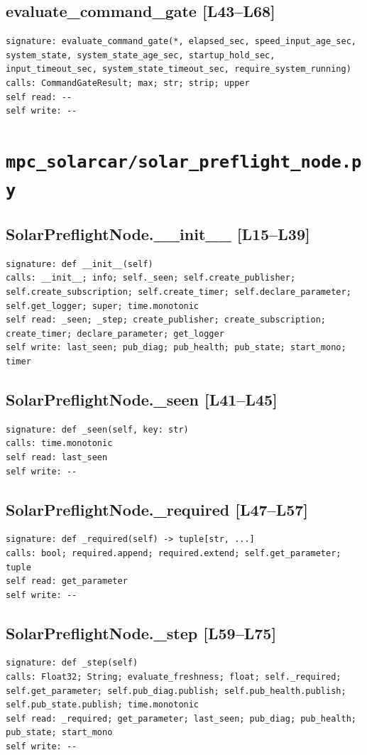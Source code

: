 \documentclass[a4paper,10pt,oneside]{book}
\begin{document}
\subsection*{evaluate\_command\_gate [L43--L68]}
\begin{lstlisting}[numbers=none]
signature: evaluate_command_gate(*, elapsed_sec, speed_input_age_sec, system_state, system_state_age_sec, startup_hold_sec, input_timeout_sec, system_state_timeout_sec, require_system_running)
calls: CommandGateResult; max; str; strip; upper
self read: --
self write: --
\end{lstlisting}
\section{\texttt{mpc\_solarcar/solar\_preflight\_node.py}}
\subsection*{SolarPreflightNode.\_\_init\_\_ [L15--L39]}
\begin{lstlisting}[numbers=none]
signature: def __init__(self)
calls: __init__; info; self._seen; self.create_publisher; self.create_subscription; self.create_timer; self.declare_parameter; self.get_logger; super; time.monotonic
self read: _seen; _step; create_publisher; create_subscription; create_timer; declare_parameter; get_logger
self write: last_seen; pub_diag; pub_health; pub_state; start_mono; timer
\end{lstlisting}
\subsection*{SolarPreflightNode.\_seen [L41--L45]}
\begin{lstlisting}[numbers=none]
signature: def _seen(self, key: str)
calls: time.monotonic
self read: last_seen
self write: --
\end{lstlisting}
\subsection*{SolarPreflightNode.\_required [L47--L57]}
\begin{lstlisting}[numbers=none]
signature: def _required(self) -> tuple[str, ...]
calls: bool; required.append; required.extend; self.get_parameter; tuple
self read: get_parameter
self write: --
\end{lstlisting}
\subsection*{SolarPreflightNode.\_step [L59--L75]}
\begin{lstlisting}[numbers=none]
signature: def _step(self)
calls: Float32; String; evaluate_freshness; float; self._required; self.get_parameter; self.pub_diag.publish; self.pub_health.publish; self.pub_state.publish; time.monotonic
self read: _required; get_parameter; last_seen; pub_diag; pub_health; pub_state; start_mono
self write: --
\end{lstlisting}
\end{document}

